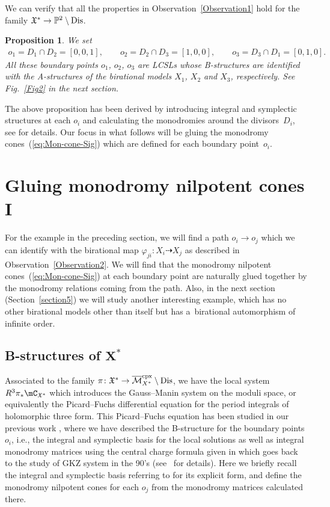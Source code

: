 \documentclass[10pt,a4paper]{amsart}
\numberwithin{equation}{section}
\newtheorem{Proposition}[Theorem]{Proposition}
\begin{document}
We can verify that all the properties in Observation~\ref{Observation1} hold for the family $\mathfrak{X}^{*}\to\mathbb{P}^{2}\setminus {\rm Dis}$.
\begin{Proposition}We set
\begin{gather*}
o_{1}=D_{1}\cap D_{2}=[0,0,1],\qquad o_{2}=D_{2}\cap D_{3}=[1,0,0],\qquad o_{3}=D_{3}\cap D_{1}=[0,1,0].
\end{gather*}
All these boundary points $o_{1}$, $o_{2}$, $o_{3}$ are LCSLs whose B-structures are identified with the A-structures of the birational models $X_{1}$, $X_{2}$ and $X_{3}$, respectively. See Fig.~{\rm \ref{Fig2}} in the next section.
\end{Proposition}

The above proposition has been derived by introducing integral and symplectic structures at each $o_{i}$ and calculating the monodromies around the divisors~$D_{i}$, see \cite[Section~6.3]{HTcmp} for details. Our focus in what follows will be gluing the monodromy cones~(\ref{eq:Mon-cone-Sig}) which are defined for each boundary point~$o_{i}$.

\section{Gluing monodromy nilpotent cones I} \label{sec:Gluing-monod-I}

For the example in the preceding section, we will find a path $o_{i}\to o_{j}$ which we can identify with the birational map $\varphi_{ji}\colon X_{i}\dashrightarrow X_{j}$ as described in Observation~\ref{Observation2}. We will find that the monodromy nilpotent cones~(\ref{eq:Mon-cone-Sig}) at each boundary point are naturally glued together by the monodromy relations coming from the path. Also, in the next section (Section~\ref{section5}) we will study another interesting example, which has no other birational models other than itself but has a~birational automorphism of infinite order.

\subsection[B-structures of $X^{*}$]{B-structures of $\boldsymbol{X^{*}}$} \label{sub:B-str-Reye}

Associated to the family $\pi\colon \mathfrak{X}^{*}\to\overline{\mathcal{M}}_{X^{*}}^{\rm cpx}\setminus {\rm Dis}$, we have the local system $R^{3}\pi_{*}\mC_{\mathfrak{X}^{*}}$ which introduces the Gauss--Manin system on the moduli space, or equivalently the Picard--Fuchs differential equation for the period integrals of holomorphic three form. This Picard--Fuchs equation has been studied in our previous work \cite{HTcmp}, where we have described the B-structure for the boundary points $o_{i}$, i.e., the integral and symplectic basis for the local solutions as well as integral monodromy matrices using the central charge formula given in \cite{IIAmonod,CentralCh} which goes back to the study of GKZ system \cite{GKZ1} in the 90's (see~\cite{HKTY,HLY} for details). Here we briefly recall the integral and symplectic basis referring to \cite{HTcmp} for its explicit form, and define the monodromy nilpotent cones for each $o_{j}$ from the monodromy matrices calculated there.
\end{document}
